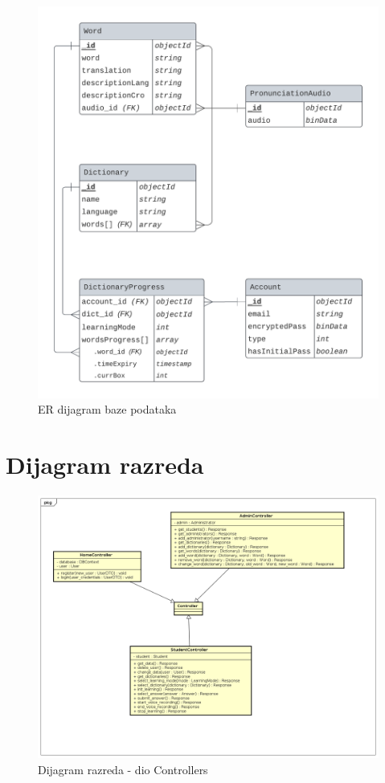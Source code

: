 			\begin{figure}[H]
				\includegraphics[width=\textwidth]{dijagrami/CanonPrinterDB_ER.png} %
				\caption{ER dijagram baze podataka}
				\label{fig:ER_dijagram} %
			\end{figure}
			
			\eject
			
			
		\section{Dijagram razreda}

			\begin{figure}[H]
				\includegraphics[width=\textwidth]{dijagrami/classcont.png} %
				\caption{Dijagram razreda - dio Controllers}
				\label{fig:classcont} %
			\end{figure}

